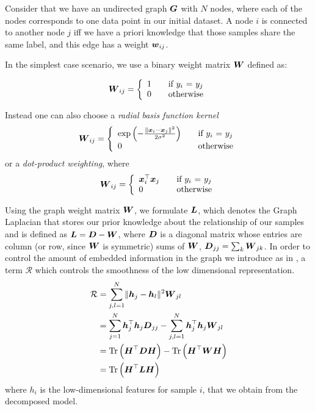 \documentclass[10pt,journal,compsoc]{IEEEtran}
\providecommand{\norm}[1]{\lVert#1\rVert}
\begin{document}
Consider that we have an undirected graph $\boldsymbol{G}$ with $N$ nodes, where each of the nodes corresponds to one data point in our initial dataset. A node $i$ is connected to another node $j$ iff we have a priori knowledge that those samples share the same label, and this edge has a weight $\boldsymbol{w}_{ij}$.

In the simplest case scenario, we use a binary weight matrix $\boldsymbol{W}$ defined as:

\begin{equation}\label{eq:construct_w}
  \boldsymbol{W}_{ij} = \left\{ 
  \begin{array}{l l}
    1 & \quad \text{if $y_i$ = $y_j$}\\
    0 & \quad \text{otherwise}
  \end{array} \right. 
\end{equation}

Instead one can also choose a {\it radial basis function kernel} \begin{equation}\label{eq:construct_w_radial}
  \bs W_{ij} = \left\{ 
  \begin{array}{l l}
     \exp\left(-\frac{\norm{\bs{x}_i - \bs{x}_j}^2}{2\sigma^2}\right) & \quad \text{if $y_i$ = $y_j$}\\
    0 & \quad \text{otherwise}
  \end{array} \right. 
\end{equation} or a {\it dot-product weighting}, where 
\begin{equation}\label{eq:construct_w_un}
  \boldsymbol{W}_{ij} = \left\{ 
  \begin{array}{l l}
     \boldsymbol{x}_i^{\top} \boldsymbol{x}_j & \quad \text{if $y_i$ = $y_j$}\\
    0 & \quad \text{otherwise}
  \end{array} \right. 
\end{equation}


Using the graph weight matrix $\boldsymbol{W}$, we formulate $\boldsymbol{L}$, which denotes the Graph Laplacian \cite{cvetkovic1980spectra} that stores our prior knowledge about the relationship of our samples and is defined as $\boldsymbol{L} = \boldsymbol{D} - \boldsymbol{W}$, where $\boldsymbol{D}$ is a diagonal matrix whose entries are column (or row, since $\boldsymbol{W}$ is symmetric) sums of $\boldsymbol{W}$, $\boldsymbol{D}_{jj} =  \sum_k \boldsymbol{W}_{jk}$. In order to control the amount of embedded information in the graph we introduce as in \cite{Belkin2002,Belkin2006,Hao2013}, a term $\mathcal R$ which controls the smoothness of the low dimensional representation. \begin{align} \notag
  \mathcal{R} &= \sum_{j,l=1}^{N} \norm{\bs h_j - \bs h_l}^2 \bs W_{jl} \\\notag
  &= \sum_{j=1}^N \bs h_j^{\top} \bs h_j \bs D_{jj}-  \sum_{j,l=1}^{N} \bs h_j^{\top} \bs h_j \bs W_{jl} \\\notag
  &= \tr\left(\bs H^{\top} \bs D \bs H\right) - \tr\left(\bs H^{\top} \bs W \bs H\right)  \\ \label{eq:term_r}
  &= \tr\left(\bs H^{\top} \bs L \bs H\right)
\end{align}
where $h_i$ is the low-dimensional features for sample $i$, that we obtain from the decomposed model.
\end{document}
